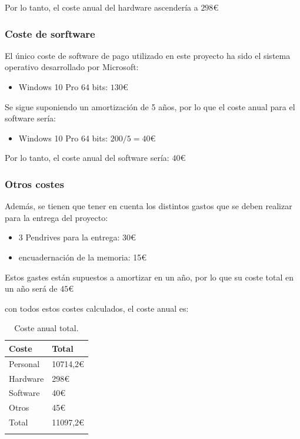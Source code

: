 Por lo tanto, el coste anual del hardware ascendería a $298$€

\subsubsection{Coste de sorftware}
El único coste de software de pago utilizado en este proyecto ha sido el sistema operativo desarrollado por Microsoft:
\begin{itemize}
    \item Windows 10 Pro 64 bits: $130$€
\end{itemize} 

Se sigue suponiendo un amortización de 5 años, por lo que el coste anual para el software sería: 
\begin{itemize}
    \item Windows 10 Pro 64 bits: $200 / 5 = 40$€
\end{itemize} 

Por lo tanto, el coste anual del software sería: $40$€

\subsubsection{Otros costes}
Además, se tienen que tener en cuenta los distintos gastos que se deben realizar para la entrega del proyecto:
\begin{itemize}
    \item 3 Pendrives para la entrega: 30€
    \item encuadernación de la memoria: 15€
\end{itemize}

Estos gastes están supuestos a amortizar en un año, por lo que su coste total en un año será de $45$€

con todos estos costes calculados, el coste anual es:

\begin{longtable}{@{} p{7cm} p{4cm} @{}}
  \toprule
  \rowcolor{gray!20}
  Coste & Total \\ 
  \midrule
  \endhead
  Personal  & 10714,2€ \\ 
  \midrule

  Hardware  & 298€ \\ 
  \midrule

  Software & 40€ \\ 
  \midrule

  Otros & 45€ \\ 
  \midrule
  \midrule

  \rowcolor{red!20}
  Total & 11097,2€ \\

  \bottomrule
  \caption{Coste anual total.}
\end{longtable}



